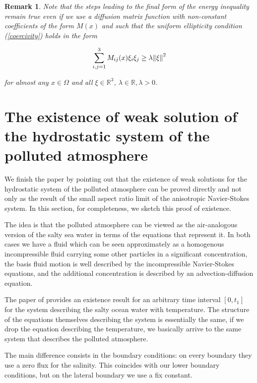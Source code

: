 \documentclass[11pt]{article}
\newtheorem{remark}{Remark}
\begin{document}
\begin{remark}
\normalfont Note that the steps leading to the final form of the energy inequality remain true even if we use a diffusion matrix function with non-constant coefficients of the form $M(x)$ and such that the uniform ellipticity condition (\ref{coercivity}) holds in the form

\begin{equation}
   \sum_{i,j = 1}^3 M_{ij}(x) \xi_i \xi_j \geq \lambda \norm{\xi}^2
\end{equation}

for almost any $x \in \Omega$ and all $\xi \in \mathbb{R}^3$, $\lambda \in \mathbb{R}, \lambda > 0.$
\end{remark}

\appendix

\section{The existence of weak solution of the hydrostatic system of the polluted atmosphere}

We finish the paper by pointing out that the existence of weak solutions for the hydrostatic system of the polluted atmosphere can be proved directly and not only as the result of the small aspect ratio limit of the anisotropic Navier-Stokes system. In this section, for completeness, we sketch this proof of existence.

The idea is that the polluted atmosphere can be viewed as the air-analogous version of the salty sea water in terms of the equations that represent it. In both cases we have a fluid which can be seen approximately as a homogenous incompressible fluid carrying some other particles in a significant concentration, the basis fluid motion is well described by the incompressible Navier-Stokes equations, and the additional concentration is described by an advection-diffusion equation. 

The paper of \cite{temam2005some} provides an existence result for an arbitrary time interval $[0, t_1]$ for the system describing the salty ocean water with temperature. The structure of the equations themselves describing the system is essentially the same, if we drop the equation describing the temperature, we basically arrive to the same system that describes the polluted atmosphere.

The main difference consists in the boundary conditions: on every boundary they use a zero flux for the salinity. This coincides with our lower boundary conditions, but on the lateral boundary we use a fix constant.
\end{document}
